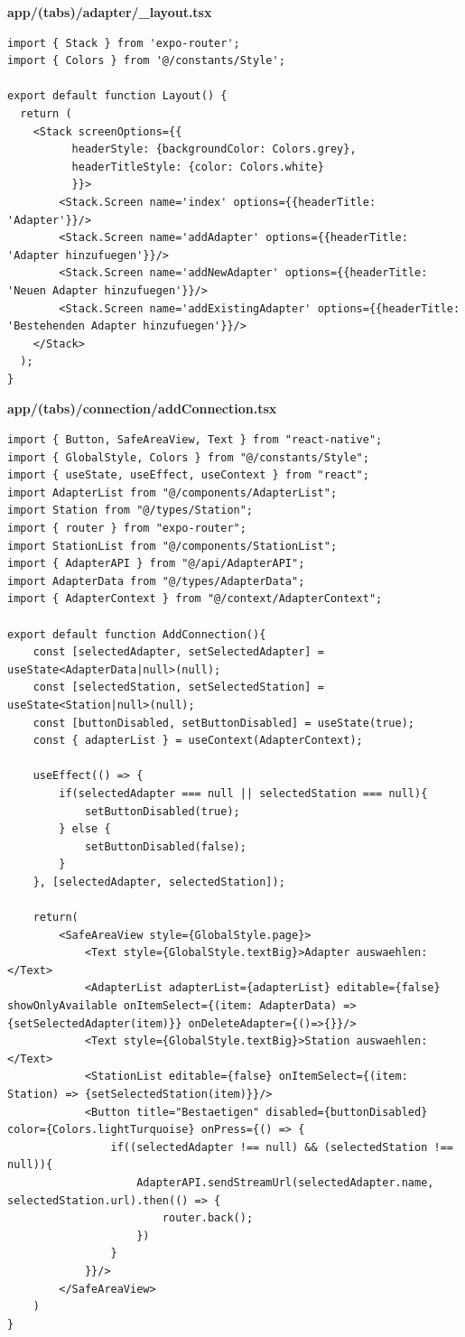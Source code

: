 \documentclass[11pt, twoside]{article}
\begin{document}
\textbf{app/(tabs)/adapter/\_layout.tsx}
\begin{lstlisting}
import { Stack } from 'expo-router';
import { Colors } from '@/constants/Style';

export default function Layout() {
  return (
    <Stack screenOptions={{
          headerStyle: {backgroundColor: Colors.grey},
          headerTitleStyle: {color: Colors.white}
          }}>
        <Stack.Screen name='index' options={{headerTitle: 'Adapter'}}/>
        <Stack.Screen name='addAdapter' options={{headerTitle: 'Adapter hinzufuegen'}}/>
        <Stack.Screen name='addNewAdapter' options={{headerTitle: 'Neuen Adapter hinzufuegen'}}/>
        <Stack.Screen name='addExistingAdapter' options={{headerTitle: 'Bestehenden Adapter hinzufuegen'}}/>
    </Stack>
  );
}
\end{lstlisting}

\textbf{app/(tabs)/connection/addConnection.tsx}
\begin{lstlisting}
import { Button, SafeAreaView, Text } from "react-native";
import { GlobalStyle, Colors } from "@/constants/Style";
import { useState, useEffect, useContext } from "react";
import AdapterList from "@/components/AdapterList";
import Station from "@/types/Station";
import { router } from "expo-router";
import StationList from "@/components/StationList";
import { AdapterAPI } from "@/api/AdapterAPI";
import AdapterData from "@/types/AdapterData";
import { AdapterContext } from "@/context/AdapterContext";

export default function AddConnection(){
    const [selectedAdapter, setSelectedAdapter] = useState<AdapterData|null>(null);
    const [selectedStation, setSelectedStation] = useState<Station|null>(null);
    const [buttonDisabled, setButtonDisabled] = useState(true);
    const { adapterList } = useContext(AdapterContext);

    useEffect(() => {
        if(selectedAdapter === null || selectedStation === null){
            setButtonDisabled(true);
        } else {
            setButtonDisabled(false);
        }
    }, [selectedAdapter, selectedStation]);

    return(
        <SafeAreaView style={GlobalStyle.page}>
            <Text style={GlobalStyle.textBig}>Adapter auswaehlen:</Text>
            <AdapterList adapterList={adapterList} editable={false} showOnlyAvailable onItemSelect={(item: AdapterData) => {setSelectedAdapter(item)}} onDeleteAdapter={()=>{}}/>
            <Text style={GlobalStyle.textBig}>Station auswaehlen:</Text>
            <StationList editable={false} onItemSelect={(item: Station) => {setSelectedStation(item)}}/>
            <Button title="Bestaetigen" disabled={buttonDisabled} color={Colors.lightTurquoise} onPress={() => {
                if((selectedAdapter !== null) && (selectedStation !== null)){
                    AdapterAPI.sendStreamUrl(selectedAdapter.name, selectedStation.url).then(() => {
                        router.back();
                    })  
                }
            }}/>
        </SafeAreaView>
    )
}
\end{lstlisting}
\end{document}
